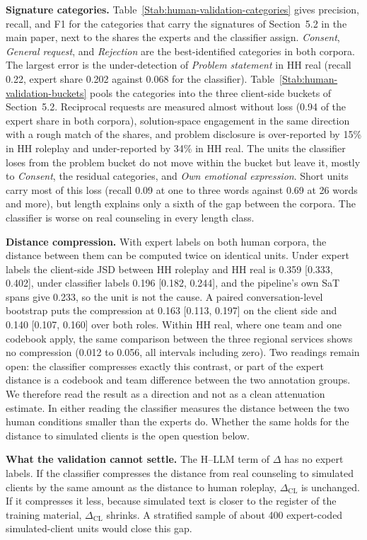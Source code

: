 \documentclass[fleqn,10pt]{JLA_article}
\begin{document}
\textbf{Signature categories.} Table~\ref{Stab:human-validation-categories} gives precision, recall, and F1 for the categories that carry the signatures of Section~5.2 in the main paper, next to the shares the experts and the classifier assign. \emph{Consent}, \emph{General request}, and \emph{Rejection} are the best-identified categories in both corpora. The largest error is the under-detection of \emph{Problem statement} in HH real (recall 0.22, expert share 0.202 against 0.068 for the classifier). Table~\ref{Stab:human-validation-buckets} pools the categories into the three client-side buckets of Section~5.2. Reciprocal requests are measured almost without loss (0.94 of the expert share in both corpora), solution-space engagement in the same direction with a rough match of the shares, and problem disclosure is over-reported by 15\% in HH roleplay and under-reported by 34\% in HH real. The units the classifier loses from the problem bucket do not move within the bucket but leave it, mostly to \emph{Consent}, the residual categories, and \emph{Own emotional expression}. Short units carry most of this loss (recall 0.09 at one to three words against 0.69 at 26 words and more), but length explains only a sixth of the gap between the corpora. The classifier is worse on real counseling in every length class.

\textbf{Distance compression.} With expert labels on both human corpora, the distance between them can be computed twice on identical units. Under expert labels the client-side JSD between HH roleplay and HH real is 0.359 [0.333, 0.402], under classifier labels 0.196 [0.182, 0.244], and the pipeline's own SaT spans give 0.233, so the unit is not the cause. A paired conversation-level bootstrap puts the compression at 0.163 [0.113, 0.197] on the client side and 0.140 [0.107, 0.160] over both roles. Within HH real, where one team and one codebook apply, the same comparison between the three regional services shows no compression (0.012 to 0.056, all intervals including zero). Two readings remain open: the classifier compresses exactly this contrast, or part of the expert distance is a codebook and team difference between the two annotation groups. We therefore read the result as a direction and not as a clean attenuation estimate. In either reading the classifier measures the distance between the two human conditions smaller than the experts do. Whether the same holds for the distance to simulated clients is the open question below.

\textbf{What the validation cannot settle.} The H--LLM term of $\Delta$ has no expert labels. If the classifier compresses the distance from real counseling to simulated clients by the same amount as the distance to human roleplay, $\Delta_{\mathrm{CL}}$ is unchanged. If it compresses it less, because simulated text is closer to the register of the training material, $\Delta_{\mathrm{CL}}$ shrinks. A stratified sample of about 400 expert-coded simulated-client units would close this gap.
\end{document}
